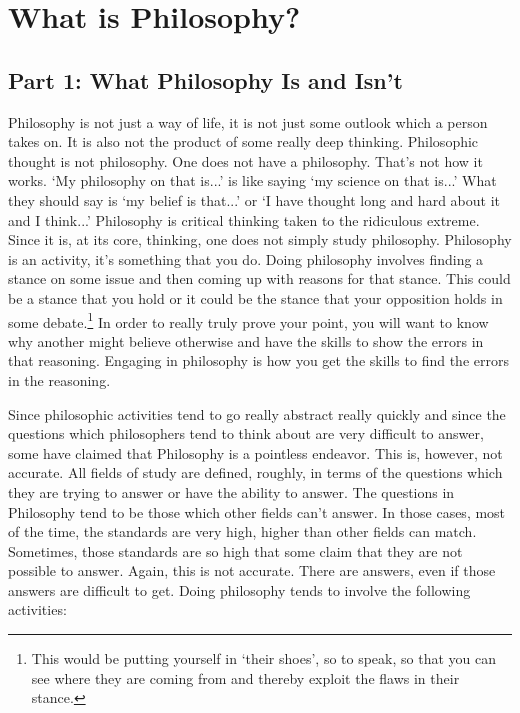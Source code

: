 \part{What is Philosophy?}
\label{ch.modone}
\chapter{Part 1: What Philosophy Is and Isn't}
Philosophy is not just a way of life, it is not just some outlook which a person takes on. It is also not the product of some really deep thinking. Philosophic thought is not philosophy. One does not have a philosophy. That's not how it works. `My philosophy on that is...' is like saying `my science on that is...' What they should say is `my belief is that...' or `I have thought long and hard about it and I think...' Philosophy is critical thinking taken to the ridiculous extreme. Since it is, at its core, thinking, one does not simply study philosophy. Philosophy is an activity, it's something that you do. Doing philosophy involves finding a stance on some issue and then coming up with reasons for that stance. This could be a stance that you hold or it could be the stance that your opposition holds in some debate.\footnote{This would be putting yourself in `their shoes', so to speak, so that you can see where they are coming from and thereby exploit the flaws in their stance.} In order to really truly prove your point, you will want to know why another might believe otherwise and have the skills to show the errors in that reasoning. Engaging in philosophy is how you get the skills to find the errors in the reasoning. 

Since philosophic activities tend to go really abstract really quickly and since the questions which philosophers tend to think about are very difficult to answer, some have claimed that Philosophy is a pointless endeavor. This is, however, not accurate. All fields of study are defined, roughly, in terms of the questions which they are trying to answer or have the ability to answer. The questions in Philosophy tend to be those which other fields can't answer. In those cases, most of the time, the standards are very high, higher than other fields can match. Sometimes, those standards are so high that some claim that they are not possible to answer. Again, this is not accurate. There are answers, even if those answers are difficult to get. Doing philosophy tends to involve the following activities:


